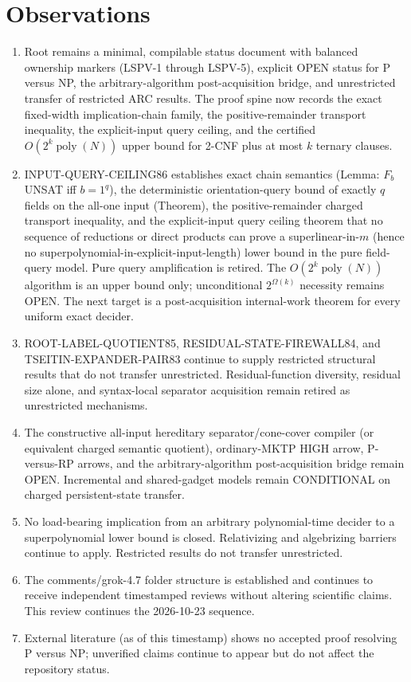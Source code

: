 \documentclass[11pt]{article}
\begin{document}
\section{Observations}
\begin{enumerate}
\item Root  remains a minimal, compilable status document with balanced ownership markers (LSPV-1 through LSPV-5), explicit OPEN status for P versus NP, the arbitrary-algorithm post-acquisition bridge, and unrestricted transfer of restricted ARC results. The proof spine now records the exact fixed-width implication-chain family, the positive-remainder transport inequality, the explicit-input query ceiling, and the certified $O(2^k\operatorname{poly}(N))$ upper bound for 2-CNF plus at most $k$ ternary clauses.
\item INPUT-QUERY-CEILING86 establishes exact chain semantics (Lemma: $F_b$ UNSAT iff $b=1^q$), the deterministic orientation-query bound of exactly $q$ fields on the all-one input (Theorem), the positive-remainder charged transport inequality, and the explicit-input query ceiling theorem that no sequence of reductions or direct products can prove a superlinear-in-$m$ (hence no superpolynomial-in-explicit-input-length) lower bound in the pure field-query model. Pure query amplification is retired. The $O(2^k\operatorname{poly}(N))$ algorithm is an upper bound only; unconditional $2^{\Omega(k)}$ necessity remains OPEN. The next target is a post-acquisition internal-work theorem for every uniform exact decider.
\item ROOT-LABEL-QUOTIENT85, RESIDUAL-STATE-FIREWALL84, and TSEITIN-EXPANDER-PAIR83 continue to supply restricted structural results that do not transfer unrestricted. Residual-function diversity, residual size alone, and syntax-local separator acquisition remain retired as unrestricted mechanisms.
\item The constructive all-input hereditary separator/cone-cover compiler (or equivalent charged semantic quotient), ordinary-MKTP HIGH arrow, P-versus-RP arrows, and the arbitrary-algorithm post-acquisition bridge remain OPEN. Incremental and shared-gadget models remain CONDITIONAL on charged persistent-state transfer.
\item No load-bearing implication from an arbitrary polynomial-time decider to a superpolynomial lower bound is closed. Relativizing and algebrizing barriers continue to apply. Restricted results do not transfer unrestricted.
\item The comments/grok-4.7 folder structure is established and continues to receive independent timestamped reviews without altering scientific claims. This review continues the 2026-10-23 sequence.
\item External literature (as of this timestamp) shows no accepted proof resolving P versus NP; unverified claims continue to appear but do not affect the repository status.
\end{enumerate}
\end{document}
